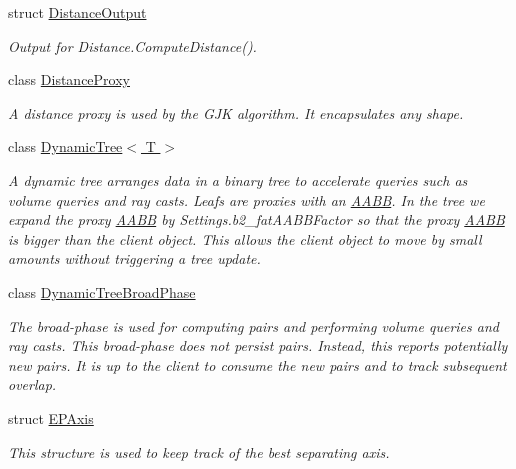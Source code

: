 \begin{DoxyCompactItemize}
struct \hyperlink{struct_farseer_physics_1_1_collision_1_1_distance_output}{Distance\+Output}
\begin{DoxyCompactList}\small\item\em Output for Distance.\+Compute\+Distance(). \end{DoxyCompactList}\item 
class \hyperlink{class_farseer_physics_1_1_collision_1_1_distance_proxy}{Distance\+Proxy}
\begin{DoxyCompactList}\small\item\em A distance proxy is used by the G\+J\+K algorithm. It encapsulates any shape. \end{DoxyCompactList}\item 
class \hyperlink{class_farseer_physics_1_1_collision_1_1_dynamic_tree_3_01_t_01_4}{Dynamic\+Tree$<$ T $>$}
\begin{DoxyCompactList}\small\item\em A dynamic tree arranges data in a binary tree to accelerate queries such as volume queries and ray casts. Leafs are proxies with an \hyperlink{struct_farseer_physics_1_1_collision_1_1_a_a_b_b}{A\+A\+B\+B}. In the tree we expand the proxy \hyperlink{struct_farseer_physics_1_1_collision_1_1_a_a_b_b}{A\+A\+B\+B} by Settings.\+b2\+\_\+fat\+A\+A\+B\+B\+Factor so that the proxy \hyperlink{struct_farseer_physics_1_1_collision_1_1_a_a_b_b}{A\+A\+B\+B} is bigger than the client object. This allows the client object to move by small amounts without triggering a tree update. \end{DoxyCompactList}\item 
class \hyperlink{class_farseer_physics_1_1_collision_1_1_dynamic_tree_broad_phase}{Dynamic\+Tree\+Broad\+Phase}
\begin{DoxyCompactList}\small\item\em The broad-\/phase is used for computing pairs and performing volume queries and ray casts. This broad-\/phase does not persist pairs. Instead, this reports potentially new pairs. It is up to the client to consume the new pairs and to track subsequent overlap. \end{DoxyCompactList}\item 
struct \hyperlink{struct_farseer_physics_1_1_collision_1_1_e_p_axis}{E\+P\+Axis}
\begin{DoxyCompactList}\small\item\em This structure is used to keep track of the best separating axis. \end{DoxyCompactList}\item 

\end{DoxyCompactItemize}
